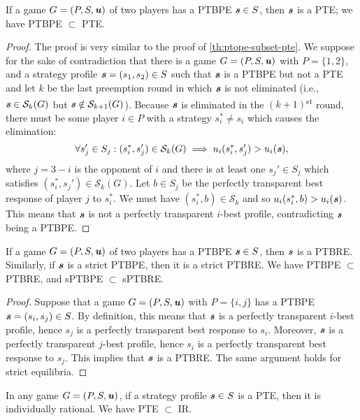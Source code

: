 \begin{lemma}
	\label{th:ptbpe-subset-pte}
	If a game $G = (P, S, \boldsymbol{\mathit{u}})$ of two players has a PTBPE $\boldsymbol{\mathit{s}} \in S$, then $\boldsymbol{\mathit{s}}$ is a PTE; we have PTBPE $\subset$ PTE.
\end{lemma}

\begin{proof}
	The proof is very similar to the proof of \autoref{th:ptope-subset-pte}.
	We suppose for the sake of contradiction that there is a game $G = (P, S, \boldsymbol{\mathit{u}})$ with $P = \{1, 2\}$, and a strategy profile $\boldsymbol{\mathit{s}} = (s_1, s_2) \in S$ such that $\boldsymbol{\mathit{s}}$ is a PTBPE but not a PTE and let $k$ be the last preemption round in which $\boldsymbol{\mathit{s}}$ is not eliminated (i.e., $\boldsymbol{\mathit{s}} \in \mathcal{S}_k(G)$ but $\boldsymbol{\mathit{s}} \notin \mathcal{S}_{k+1}(G)$).
	Because $\boldsymbol{\mathit{s}}$ is eliminated in the $(k+1)$\textsuperscript{st} round, there must be some player $i \in P$ with a strategy $s_i^* \ne s_i$ which causes the elimination:
	\[
		\forall s_j' \in S_j: (s_i^*, s_j') \in \mathcal{S}_k(G) \implies u_i(s_i^*, s_j') > u_i(\boldsymbol{\mathit{s}}),
	\]
	where $j = 3 - i$ is the opponent of $i$ and there is at least one $s_j' \in S_j$ which satisfies $(s_i^*, s_j') \in \mathcal{S}_k(G)$.
	Let $b \in S_j$ be the perfectly transparent best response of player $j$ to $s_i^*$.
	We must have $(s_i^*, b) \in \mathcal{S}_k$ and so $u_i(s_i^*, b) > u_i(\boldsymbol{\mathit{s}})$.
	This means that $\boldsymbol{\mathit{s}}$ is not a perfectly transparent $i$-best profile, contradicting $\boldsymbol{\mathit{s}}$ being a PTBPE.
\end{proof}

\begin{lemma}
	\label{th:ptbpe-subset-ptbre}
	If a game $G = (P, S, \boldsymbol{\mathit{u}})$ of two players has a PTBPE $\boldsymbol{\mathit{s}} \in S$, then $\boldsymbol{\mathit{s}}$ is a PTBRE.
	Similarly, if $\boldsymbol{\mathit{s}}$ is a strict PTBPE, then it is a strict PTBRE.
	We have PTBPE $\subset$ PTBRE, and sPTBPE $\subset$ sPTBRE.
\end{lemma}

\begin{proof}
	Suppose that a game $G = (P, S, \boldsymbol{\mathit{u}})$ with $P = \{i, j\}$ has a PTBPE $\boldsymbol{\mathit{s}} = (s_i, s_j) \in S$.
	By definition, this means that $\boldsymbol{\mathit{s}}$ is a perfectly transparent $i$-best profile, hence $s_j$ is a perfectly transparent best response to $s_i$.
	Moreover, $\boldsymbol{\mathit{s}}$ is a perfectly transparent $j$-best profile, hence $s_i$ is a perfectly transparent best response to $s_j$.
	This implies that $\boldsymbol{\mathit{s}}$ is a PTBRE.
	The same argument holds for strict equilibria.
\end{proof}

\begin{observation}
	\label{th:pte-subset-ir}
	In any game $G = (P, S, \boldsymbol{\mathit{u}})$, if a strategy profile $\boldsymbol{\mathit{s}} \in S$ is a PTE, then it is individually rational.
	We have PTE $\subset$ IR.
\end{observation}

